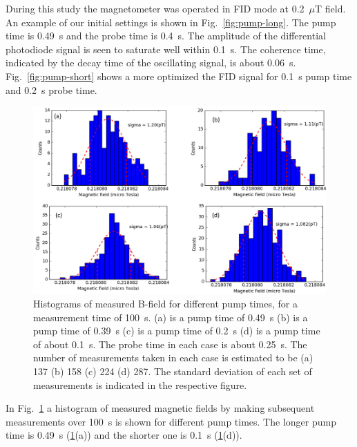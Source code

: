 During this study the magnetometer was operated in FID mode at
0.2~$\mu$T field.
An example of our initial settings is shown in
Fig.~\ref{fig:pump-long}.  The pump time is 0.49~s and the probe time
is 0.4~s.  The amplitude of the differential photodiode signal is seen
to saturate well within 0.1~s.  The coherence time, indicated by the
decay time of the oscillating signal, is about 0.06~s.
Fig.~\ref{fig:pump-short} shows a more optimized the FID signal for
0.1~s pump time and 0.2~s probe time.
\begin{figure}%
  \centering\includegraphics[width=\linewidth]{figures/pump_time_}
  \caption{Histograms of measured B-field for different pump times,
    for a measurement time of 100~s.  (a) is a pump time of 0.49~s (b)
    is a pump time of 0.39~s (c) is a pump time of 0.2~s (d) is a pump
    time of about 0.1~s.  The probe time in each case is about 0.25~s.
    The number of measurements taken in each case is estimated to be
    (a) 137 (b) 158 (c) 224 (d) 287.  The standard deviation of each
    set of measurements is indicated in the respective
    figure.}\label{fig:different-pump-time}
\end{figure}

In Fig.~\ref{fig:different-pump-time} a histogram of measured magnetic
fields by making subsequent measurements over 100~s is shown for
different pump times.  The longer pump time is 0.49~s
(\ref{fig:different-pump-time}(a)) and the shorter one is 0.1~s
(\ref{fig:different-pump-time}(d)).

